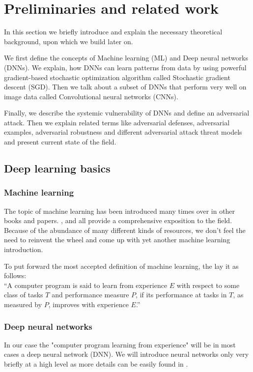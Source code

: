 \chapter{Preliminaries and related work}
\label{preliminaries}

In this section we briefly introduce and explain the necessary theoretical background, upon which we build later on.

We first define the concepts of Machine learning (ML) and Deep neural networks (DNNs). We explain, how DNNs can learn patterns from data by using powerful gradient-based stochastic optimization algorithm called Stochastic gradient descent (SGD). Then we talk about a subset of DNNs that perform very well on image data called Convolutional neural networks (CNNs).

Finally, we describe the systemic vulnerability of DNNs and define an adversarial attack. Then we explain related terms like adversarial defenses, adversarial examples, adversarial robustness and different adversarial attack threat models and present current state of the field.


\section{Deep learning basics}

\subsection{Machine learning}
The topic of machine learning has been introduced many times over in other books and papers. \cite{10.5555/2380985}, \cite{10.5555/1162264} and \cite{Goodfellow-et-al-2016} all provide a comprehensive exposition to the field. Because of the abundance of many different kinds of resources, we don't feel the need to reinvent the wheel and come up with yet another machine learning introduction. 

To put forward the most accepted definition of machine learning, the \cite{10.5555/2380985} lay it as follows: \\

“A computer program is said to learn from experience $E$ with respect to some class of tasks $T$ and performance measure $P$, if its performance at tasks in $T$, as measured by $P$, improves with experience $E$.”

\subsection{Deep neural networks}
In our case the "computer program learning from experience" will be in most cases a deep neural network (DNN). We will introduce neural networks only very briefly at a high level as more details can be easily found in \cite{Goodfellow-et-al-2016}.

